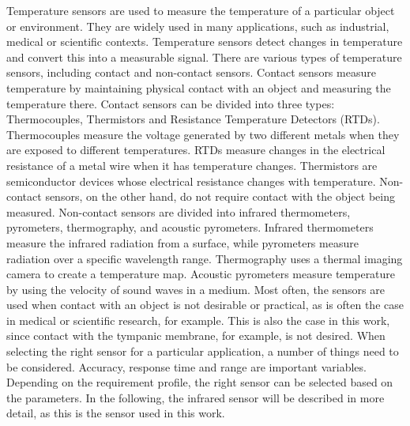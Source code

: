 Temperature sensors are used to measure the temperature of a particular object or environment.
They are widely used in many applications, such as industrial, medical or scientific contexts.
Temperature sensors detect changes in temperature and convert this into a measurable signal.
There are various types of temperature sensors, including contact and non-contact sensors.
Contact sensors measure temperature by maintaining physical contact with an object and measuring the temperature there.
Contact sensors can be divided into three types: Thermocouples, Thermistors and Resistance Temperature Detectors (RTDs). 
Thermocouples measure the voltage generated by two different metals when they are exposed to different temperatures.
RTDs measure changes in the electrical resistance of a metal wire when it has temperature changes.
Thermistors are semiconductor devices whose electrical resistance changes with temperature.
Non-contact sensors, on the other hand, do not require contact with the object being measured. 
Non-contact sensors are divided into infrared thermometers, pyrometers, thermography, and acoustic pyrometers.
Infrared thermometers measure the infrared radiation from a surface, while pyrometers measure radiation over a specific wavelength range.
Thermography uses a thermal imaging camera to create a temperature map.
Acoustic pyrometers measure temperature by using the velocity of sound waves in a medium.
Most often, the sensors are used when contact with an object is not desirable or practical, as is often the case in medical or scientific research, for example. 
This is also the case in this work, since contact with the tympanic membrane, for example, is not desired.
When selecting the right sensor for a particular application, a number of things need to be considered.
Accuracy, response time and range are important variables.
Depending on the requirement profile, the right sensor can be selected based on the parameters.
In the following, the infrared sensor will be described in more detail, as this is the sensor used in this work.

